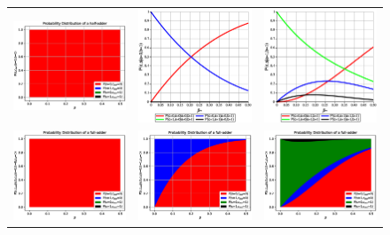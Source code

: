 \begin{figure}
    \begin{tabular}{ccc}
        \includegraphics[width=.3\textwidth]{media/noisy_half_adder_value_dist_00.eps} &
        \includegraphics[width=.3\textwidth]{media/noisy_half_adder_value_dist_01.eps} &
        \includegraphics[width=.3\textwidth]{media/noisy_half_adder_value_dist_11.eps} \\
        \includegraphics[width=.3\textwidth]{media/noisy_full_adder_value_dist_000.eps} &
        \includegraphics[width=.3\textwidth]{media/noisy_full_adder_value_dist_010.eps} &
        \includegraphics[width=.3\textwidth]{media/noisy_full_adder_value_dist_110.eps} \\

\end{tabular}
\end{figure}
